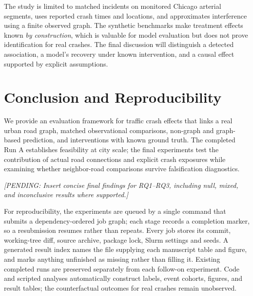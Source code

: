 \documentclass[sigconf,nonacm]{acmart}
\newcommand{\pending}[1]{\textcolor{pendinggray}{\emph{[PENDING: #1]}}}
\begin{document}
The study is limited to matched incidents on monitored Chicago arterial
segments, uses reported crash times and locations, and approximates
interference using a finite observed graph. The synthetic benchmarks
make treatment effects known \emph{by construction}, which is valuable
for model evaluation but does not prove identification for real
crashes. The final discussion will distinguish a detected association,
a model's recovery under known intervention, and a causal effect
supported by explicit assumptions.

\section{Conclusion and Reproducibility}
We provide an evaluation framework for traffic crash effects that
links a real urban road graph, matched observational comparisons,
non-graph and graph-based prediction, and interventions with known
ground truth. The completed Run A establishes feasibility at city
scale; the final experiments test the contribution of actual road
connections and explicit crash exposures while examining whether
neighbor-road comparisons survive falsification diagnostics.

\pending{Insert concise final findings for RQ1--RQ3, including null,
mixed, and inconclusive results where supported.}

For reproducibility, the experiments are queued by a single command that
submits a dependency-ordered job graph; each stage records a completion marker,
so a resubmission resumes rather than repeats. Every job stores its commit,
working-tree diff, source archive, package lock, Slurm settings and seeds. A
generated result index names the file supplying each manuscript table and
figure, and marks anything unfinished as missing rather than filling it. Existing completed runs are preserved separately from each
follow-on experiment. Code and scripted analyses automatically
construct labels, event cohorts, figures, and result tables; the
counterfactual outcomes for real crashes remain unobserved.



\end{document}
